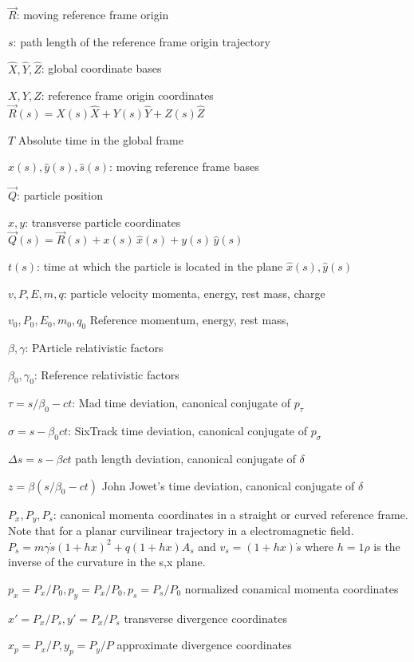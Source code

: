 \documentclass[english]{article}
\begin{document}
\begin{description}
\item $\vec R$: moving reference frame origin
\item $s$: path length of the reference frame origin trajectory
\item $\hat X, \hat Y,\hat Z$: global coordinate bases
\item $X, Y, Z$: reference frame origin coordinates $\vec R(s)=X(s) \hat X+Y(s) \hat Y+ Z(s) \hat Z$
\item $T$ Absolute time in the global frame
\item $\hat x(s), \hat y(s), \hat s(s)$: moving reference frame bases
\item $\vec Q$: particle position
\item $x, y$: transverse particle coordinates $\vec Q(s)= \vec R(s) + x(s) \,\hat x(s) + y(s)\, \hat y(s)$
\item $t(s)$: time at which the particle is located in the plane $\hat x(s), \hat y(s)$
\item $v, P, E, m, q$: particle velocity momenta, energy, rest mass, charge
\item $v_0, P_0, E_0, m_0, q_0$ Reference momentum, energy, rest mass,
\item $\beta, \gamma$: PArticle relativistic factors
\item $\beta_0, \gamma_0$: Reference relativistic factors
\item $\tau=s/\beta_0 - c t$: Mad time deviation, canonical conjugate of $p_\tau$
\item $\sigma=s - \beta_0 c t$: SixTrack time deviation, canonical conjugate of $p_\sigma$
\item $\Delta s=s - \beta c t  $  path length deviation, canonical conjugate of $\delta$
\item $z=\beta(s/\beta_0 - c t) $  John Jowet's time deviation, canonical conjugate of $\delta$
\item $P_x, P_y,  P_s$: canonical momenta coordinates in a straight or curved reference frame. Note that for a planar curvilinear trajectory in a electromagnetic field.
$P_s=m \gamma \dot s (1 + hx)^2 + q (1 + hx) A_s$ and $v_s= (1 +h x) \dot s$ where $h=1\rho$ is the inverse of the curvature in the s,x plane.   
\item $p_x=P_x/P_0, p_y=P_x/P_0, p_s=P_s/P_0$ normalized conamical momenta coordinates
\item $x'=P_x/P_s,y'=P_x/P_s$ transverse divergence coordinates
\item $x_p=P_x/P,y_p=P_y/P$ approximate divergence coordinates

\end{description}
\end{document}
